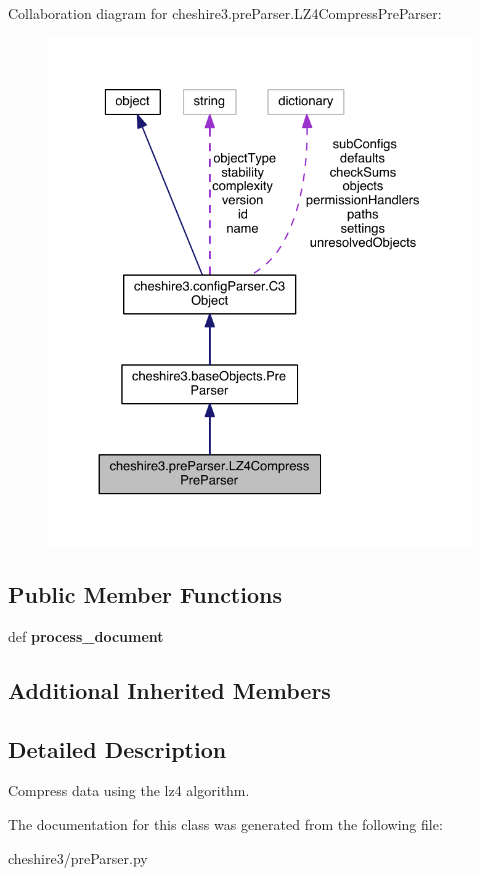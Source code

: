 Collaboration diagram for cheshire3.\-pre\-Parser.\-L\-Z4\-Compress\-Pre\-Parser\-:
\nopagebreak
\begin{figure}[H]
\begin{center}
\leavevmode
\includegraphics[width=330pt]{classcheshire3_1_1pre_parser_1_1_l_z4_compress_pre_parser__coll__graph}
\end{center}
\end{figure}
\subsection*{Public Member Functions}
\begin{DoxyCompactItemize}
\item 
\hypertarget{classcheshire3_1_1pre_parser_1_1_l_z4_compress_pre_parser_ac245ec227ca03031de08c1a158be9474}{def {\bfseries process\-\_\-document}}\label{classcheshire3_1_1pre_parser_1_1_l_z4_compress_pre_parser_ac245ec227ca03031de08c1a158be9474}

\end{DoxyCompactItemize}
\subsection*{Additional Inherited Members}


\subsection{Detailed Description}
\begin{DoxyVerb}Compress data using the lz4 algorithm.\end{DoxyVerb}
 

The documentation for this class was generated from the following file\-:\begin{DoxyCompactItemize}
\item 
cheshire3/pre\-Parser.\-py\end{DoxyCompactItemize}

